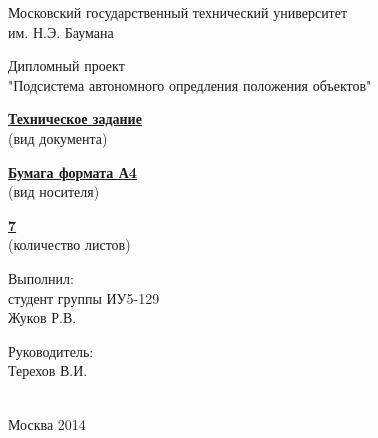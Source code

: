 \thispagestyle{empty}

\begin{center}
Московский государственный технический университет \\ им. Н.Э. Баумана \\
\hrulefill
\end{center}

\vspace{8em}

\begin{center}
\large Дипломный проект \\ "Подсистема автономного опредления положения объектов"
\end{center}

\vspace{2em}
\thispagestyle{empty}

\begin{center}
\underline{\textbf{Техническое задание}} \\ (вид документа)
\end{center}

\begin{center}
\underline{\textbf{Бумага формата А4}} \\ (вид носителя)
\end{center}

\begin{center}
\underline{\textbf{7}} \\ (количество листов) %
\end{center}

\vspace{2em}

\begin{flushright}
Выполнил: \\ студент группы ИУ5-129 \\ Жуков Р.В. \par\bigskip

Руководитель: \\ Терехов В.И.
\end{flushright}

\vspace{\fill}

\begin{center}
\hrulefill \\
Москва 2014
\end{center}

\newpage